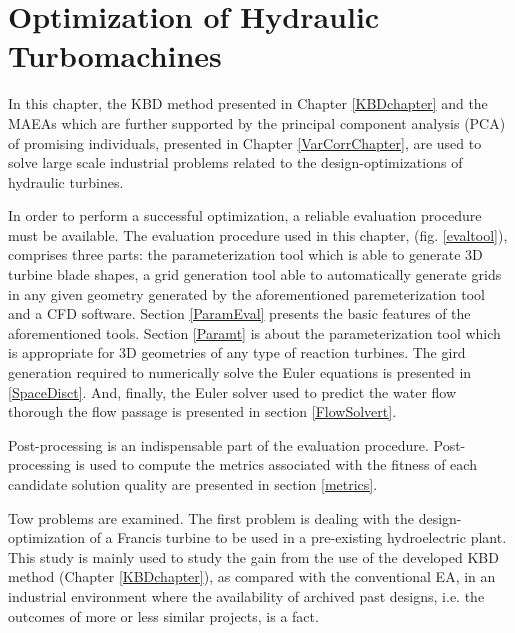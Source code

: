 \ifpdf
    \graphicspath{{5/figures/PNG/}{5/figures/PDF/}{4/figures/}}
\else
    \graphicspath{{5/figures/EPS/}{5/figures/}}
\fi

\chapter{Optimization of Hydraulic Turbomachines} %

In this chapter, the KBD method presented in Chapter \ref{KBDchapter} and the MAEAs which are further supported by the principal component analysis (PCA) of promising individuals, presented in Chapter \ref{VarCorrChapter}, are used to solve large scale industrial problems related to the design-optimizations  of hydraulic turbines. 

In order to perform a successful optimization, a reliable evaluation procedure must be available. The evaluation procedure used in this chapter,  (fig. \ref{evaltool}), comprises three parts: the parameterization tool which is able to generate 3D turbine blade shapes, a grid generation tool able to automatically generate grids in any given geometry generated by the aforementioned paremeterization tool and a CFD software. Section \ref{ParamEval} presents the basic features of the aforementioned tools. Section \ref{Paramt} is about the  parameterization tool  which is appropriate for 3D geometries of any type of reaction turbines. The gird generation required to numerically solve the Euler equations is presented in \ref{SpaceDisct}. And, finally, the Euler solver used to predict the water flow thorough the flow passage is presented in section \ref{FlowSolvert}.

Post-processing is an indispensable part of the evaluation procedure. Post-processing is used to compute the metrics associated with the fitness of each candidate solution quality are presented in section \ref{metrics}. 

Tow problems are examined. The first problem is  dealing with the design-optimization of a Francis turbine to be used in a pre-existing hydroelectric plant. This study is mainly used to study the gain from the use of the developed KBD method (Chapter \ref{KBDchapter}), as compared with the conventional EA, in an industrial environment where the availability of archived past designs, i.e. the outcomes of more or less similar projects, is a fact.

